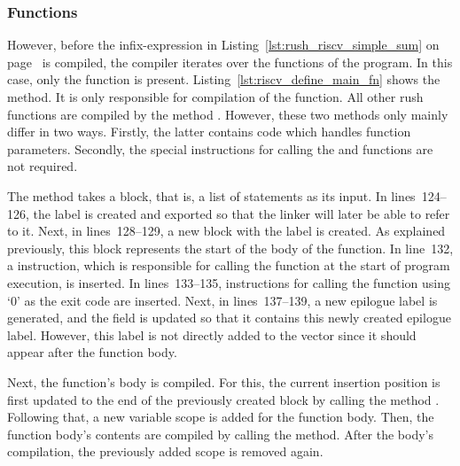 \subsubsection{Functions}

However, before the infix-expression in Listing~\ref{lst:rush_riscv_simple_sum} on page~\pageref{lst:rush_riscv_simple_sum} is compiled, the compiler iterates over the functions of the program.
In this case, only the  function is present.
Listing~\ref{lst:riscv_define_main_fn} shows the  method.
It is only responsible for compilation of the  function.
All other rush functions are compiled by the method .
However, these two methods only mainly differ in two ways.
Firstly, the latter contains code which handles function parameters.
Secondly, the special instructions for calling the  and  functions are not required.


The method takes a block, that is, a list of statements as its input.
In lines~124--126, the  label is created and exported so that the linker will later be able to refer to it.
Next, in lines~128--129, a new block with the  label is created.
As explained previously, this block represents the start of the body of the  function.
In line~132, a  instruction, which is responsible for calling the  function at the start of program execution, is inserted.
In lines~133--135, instructions for calling the  function using `0' as the exit code are inserted.
Next, in lines~137--139, a new epilogue label is generated, and the  field is updated so that it contains this newly created epilogue label.
However, this label is not directly added to the  vector since it should appear after the function body.

Next, the  function's body is compiled.
For this, the current insertion position is first updated to the end of the previously created  block by calling the method .
Following that, a new variable scope is added for the function body.
Then, the function body's contents are compiled by calling the  method.
After the body's compilation, the previously added scope is removed again.

